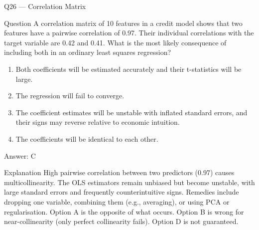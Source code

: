 \documentclass[aspectratio=169,8pt]{beamer}
\begin{document}
	\begin{frame}{Q26 --- Correlation Matrix}
		\begin{block}{Question}
			A correlation matrix of 10 features in a credit model shows that two features have a pairwise correlation of 0.97. Their individual correlations with the target variable are 0.42 and 0.41. What is the most likely consequence of including both in an ordinary least squares regression?
		\end{block}
		\begin{enumerate}
			\item Both coefficients will be estimated accurately and their t-statistics will be large.
			\item The regression will fail to converge.
			\item The coefficient estimates will be unstable with inflated standard errors, and their signs may reverse relative to economic intuition.
			\item The coefficients will be identical to each other.
		\end{enumerate}
		\begin{exampleblock}{Answer: C}\end{exampleblock}
		\begin{block}{Explanation}
			High pairwise correlation between two predictors (0.97) causes multicollinearity. The OLS estimators remain unbiased but become unstable, with large standard errors and frequently counterintuitive signs. Remedies include dropping one variable, combining them (e.g., averaging), or using PCA or regularisation. Option A is the opposite of what occurs. Option B is wrong for near-collinearity (only perfect collinearity fails). Option D is not guaranteed.
		\end{block}
	\end{frame}
	
\end{document}
